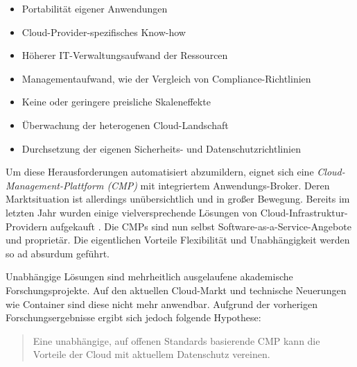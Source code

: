 %
%
%
%
%

\begin{itemize}
	\item Portabilität eigener Anwendungen
	\item Cloud-Provider-spezifisches Know-how
	\item Höherer IT-Verwaltungsaufwand der Ressourcen
	\item Managementaufwand, wie der Vergleich von Compliance-Richtlinien
	\item Keine oder geringere preisliche Skaleneffekte
	\item Überwachung der heterogenen Cloud-Landschaft
	\item Durchsetzung der eigenen Sicherheits- und Datenschutzrichtlinien
\end{itemize}

\noindent
Um diese Herausforderungen automatisiert abzumildern, eignet sich eine \emph{Cloud-Management-Plattform (CMP)} mit integriertem Anwendungs-Broker. Deren Marktsituation ist allerdings unübersichtlich und in großer Bewegung. Bereits im letzten Jahr wurden einige vielversprechende Lösungen von Cloud-Infrastruktur-Providern aufgekauft \cite{gartner:2017:cloud-market-multicloud-trend}. Die CMPs sind nun selbst Software-as-a-Service-Angebote und proprietär. Die eigentlichen Vorteile Flexibilität und Unabhängigkeit werden so ad absurdum geführt.

Unabhängige Lösungen sind mehrheitlich ausgelaufene akademische Forschungsprojekte. Auf den aktuellen Cloud-Markt und technische Neuerungen wie Container sind diese nicht mehr anwendbar. Aufgrund der vorherigen Forschungsergebnisse ergibt sich jedoch folgende Hypothese:


\begin{verse}
	{Eine unabhängige, auf offenen Standards basierende CMP kann die Vorteile der Cloud mit aktuellem Datenschutz vereinen.}
\end{verse}

